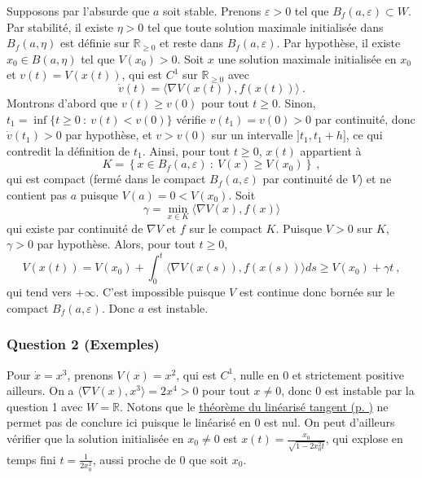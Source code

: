 Supposons par l'absurde que \(a\) soit stable. Prenons
\(\varepsilon>0\) tel que \(B_f(a,\varepsilon)\subset W\). Par
stabilité, il existe \(\eta>0\) tel que toute solution maximale
initialisée dans \(B_f(a,\eta)\) est définie sur
\(\mathbb{R}_{\geq 0}\) et reste dans \(B_f(a,\varepsilon)\). Par
hypothèse, il existe \(x_0\in B(a,\eta)\) tel que \(V(x_0)>0\). Soit
\(x\) une solution maximale initialisée en \(x_0\) et
\(v(t)=V(x(t))\), qui est \(C^1\) sur \(\mathbb{R}_{\geq 0}\) avec \[
\dot{v}(t) = \langle\nabla V (x(t)), f(x(t))\rangle \ .
\] Montrons d'abord que \(v(t)\geq v(0)\) pour tout \(t\geq 0\). Sinon,
\(t_1 = \inf\{t\geq 0 \ : \ v(t)<v(0)\}\) vérifie \(v(t_1)=v(0)>0\) par
continuité, donc \(\dot{v}(t_1)>0\) par hypothèse, et \(v>v(0)\) sur un
intervalle \(]t_1,t_1+h]\), ce qui contredit la définition de \(t_1\).
Ainsi, pour tout \(t\geq 0\), \(x(t)\) appartient à \[
K = \left\{ x\in B_f(a,\varepsilon) \ : \ V(x)\geq V(x_0) \right\} \ ,
\] qui est compact (fermé dans le compact \(B_f(a,\varepsilon)\) par
continuité de \(V\)) et ne contient pas \(a\) puisque \(V(a)=0<V(x_0)\).
Soit \[
\gamma = \min_{x\in K} \langle\nabla V (x), f(x)\rangle
\] qui existe par continuité de \(\nabla V\) et \(f\) sur le compact
\(K\). Puisque \(V>0\) sur \(K\), \(\gamma>0\) par hypothèse. Alors,
pour tout \(t\geq 0\), \[
V(x(t)) = V(x_0) + \int_0^t \langle\nabla V (x(s)), f(x(s))\rangle ds \geq V(x_0) + \gamma t \ ,
\] qui tend vers \(+\infty\). C'est impossible puisque \(V\) est
continue donc bornée sur le compact \(B_f(a,\varepsilon)\). Donc \(a\)
est instable.

\hypertarget{answer-instab-2}{%
\subsubsection*{Question 2 (Exemples)}\label{answer-instab-2}}


Pour \(\dot{x}=x^3\), prenons \(V(x)=x^2\), qui est \(C^1\), nulle en
\(0\) et strictement positive ailleurs. On a
\(\langle\nabla V (x), x^3\rangle = 2x^4 >0\) pour tout \(x\neq 0\), donc
\(0\) est instable par la question 1 avec \(W=\mathbb{R}\). Notons que
le \protect\hyperlink{theo_linTangent}{théorème du linéarisé tangent (p.
\pageref*{theo_linTangent})} ne permet pas de conclure ici puisque le
linéarisé en \(0\) est nul. On peut d'ailleurs vérifier que la solution
initialisée en \(x_0\neq 0\) est
\(x(t)=\frac{x_0}{\sqrt{1-2x_0^2 t}}\), qui explose en temps fini
\(t=\frac{1}{2x_0^2}\), aussi proche de \(0\) que soit \(x_0\).

